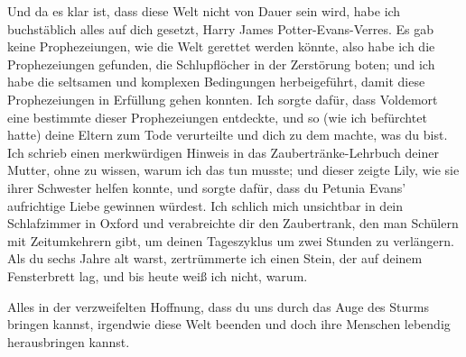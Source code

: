 \begin{writtenNote}
Und da es klar ist, dass diese Welt nicht von Dauer sein wird, habe ich buchstäblich alles auf dich gesetzt, Harry James Potter-Evans-Verres. Es gab keine Prophezeiungen, wie die Welt gerettet werden könnte, also habe ich die Prophezeiungen gefunden, die Schlupflöcher in der Zerstörung boten; und ich habe die seltsamen und komplexen Bedingungen herbeigeführt, damit diese Prophezeiungen in Erfüllung gehen konnten. Ich sorgte dafür, dass Voldemort eine bestimmte dieser Prophezeiungen entdeckte, und so (wie ich befürchtet hatte) deine Eltern zum Tode verurteilte und dich zu dem machte, was du bist. Ich schrieb einen merkwürdigen Hinweis in das Zaubertränke-Lehrbuch deiner Mutter, ohne zu wissen, warum ich das tun musste; und dieser zeigte Lily, wie sie ihrer Schwester helfen konnte, und sorgte dafür, dass du Petunia Evans’ aufrichtige Liebe gewinnen würdest. Ich schlich mich unsichtbar in dein Schlafzimmer in Oxford und verabreichte dir den Zaubertrank, den man Schülern mit Zeitumkehrern gibt, um deinen Tageszyklus um zwei Stunden zu verlängern. Als du sechs Jahre alt warst, zertrümmerte ich einen Stein, der auf deinem Fensterbrett lag, und bis heute weiß ich nicht, warum.

Alles in der verzweifelten Hoffnung, dass du uns durch das Auge des Sturms bringen kannst, irgendwie diese Welt beenden und doch ihre Menschen lebendig herausbringen kannst.


\end{writtenNote}
